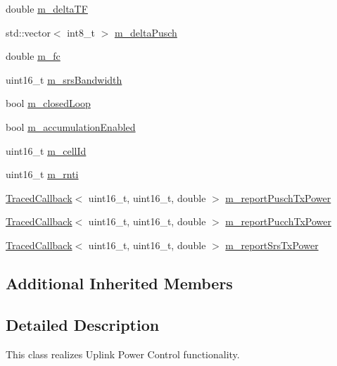 \begin{DoxyCompactItemize}
\item 
double \hyperlink{classns3_1_1LteUePowerControl_ad57d7065b724760ccb49a5aa625786f9}{m\+\_\+delta\+TF}
\item 
std\+::vector$<$ int8\+\_\+t $>$ \hyperlink{classns3_1_1LteUePowerControl_aaa037e0d62eb579bf3c8fbc5f6b8bbe7}{m\+\_\+delta\+Pusch}
\item 
double \hyperlink{classns3_1_1LteUePowerControl_abb88ddede786f6cd19e8aab4992d6000}{m\+\_\+fc}
\item 
uint16\+\_\+t \hyperlink{classns3_1_1LteUePowerControl_ac8b0e0c7810843b96f5fa425ba5c838e}{m\+\_\+srs\+Bandwidth}
\item 
bool \hyperlink{classns3_1_1LteUePowerControl_a0bb35bbebbdd20c4c6140b984332367b}{m\+\_\+closed\+Loop}
\item 
bool \hyperlink{classns3_1_1LteUePowerControl_afb48a41c71eee57f8e624420aad0d073}{m\+\_\+accumulation\+Enabled}
\item 
uint16\+\_\+t \hyperlink{classns3_1_1LteUePowerControl_a29e1aec2d0ad8851858b4d479d21fea9}{m\+\_\+cell\+Id}
\item 
uint16\+\_\+t \hyperlink{classns3_1_1LteUePowerControl_a1bce996e7c1936c385804bd367457e13}{m\+\_\+rnti}
\item 
\hyperlink{classns3_1_1TracedCallback}{Traced\+Callback}$<$ uint16\+\_\+t, uint16\+\_\+t, double $>$ \hyperlink{classns3_1_1LteUePowerControl_af7702b77c409754f3edf7c887073207d}{m\+\_\+report\+Pusch\+Tx\+Power}
\item 
\hyperlink{classns3_1_1TracedCallback}{Traced\+Callback}$<$ uint16\+\_\+t, uint16\+\_\+t, double $>$ \hyperlink{classns3_1_1LteUePowerControl_a327b43591fbfc775bca9a4948a57489e}{m\+\_\+report\+Pucch\+Tx\+Power}
\item 
\hyperlink{classns3_1_1TracedCallback}{Traced\+Callback}$<$ uint16\+\_\+t, uint16\+\_\+t, double $>$ \hyperlink{classns3_1_1LteUePowerControl_a1eed65ba5f8536af5999b925dc73bdad}{m\+\_\+report\+Srs\+Tx\+Power}
\end{DoxyCompactItemize}
\subsection*{Additional Inherited Members}


\subsection{Detailed Description}
This class realizes Uplink Power Control functionality. 

